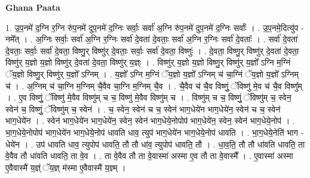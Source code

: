 \documentclass[17pt]{extarticle}
\begin{document}
\textbf{Ghana Paata } \newline

1. उ॒प॒नमे॑ द॒ग्नि र॒ग्नि रु॑प॒नमे॑ दुप॒नमे॑ द॒ग्निः सर्वाः॒ सर्वा॑ अ॒ग्नि रु॑प॒नमे॑ दुप॒नमे॑ द॒ग्निः सर्वाः᳚ । . उ॒प॒नमे॒दित्यु॑प - नमे᳚त् । . अ॒ग्निः सर्वाः॒ सर्वा॑ अ॒ग्नि र॒ग्निः सर्वा॑ दे॒वता॑ दे॒वताः॒ सर्वा॑ अ॒ग्नि र॒ग्निः सर्वा॑ दे॒वताः᳚ । . सर्वा॑ दे॒वता॑ दे॒वताः॒ सर्वाः॒ सर्वा॑ दे॒वता॒ विष्णु॒र् विष्णु॑र् दे॒वताः॒ सर्वाः॒ सर्वा॑ दे॒वता॒ विष्णुः॑ । . दे॒वता॒ विष्णु॒र् विष्णु॑र् दे॒वता॑ दे॒वता॒ विष्णु॑र् य॒ज्ञो य॒ज्ञो विष्णु॑र् दे॒वता॑ दे॒वता॒ विष्णु॑र् य॒ज्ञ्ः । . विष्णु॑र् य॒ज्ञो य॒ज्ञो विष्णु॒र् विष्णु॑र् य॒ज्ञो᳚ ऽग्नि म॒ग्निं ॅय॒ज्ञो विष्णु॒र् विष्णु॑र् य॒ज्ञो᳚ ऽग्निम् । . य॒ज्ञो᳚ ऽग्नि म॒ग्निं ॅय॒ज्ञो य॒ज्ञो᳚ ऽग्निम् च॑ चा॒ग्निं ॅय॒ज्ञो य॒ज्ञो᳚ ऽग्निम् च॑ । . अ॒ग्निम् च॑ चा॒ग्नि म॒ग्निम् चै॒वैव चा॒ग्नि म॒ग्निम् चै॒व । . चै॒वैव च॑ चै॒व विष्णुं॒ ॅविष्णु॑ मे॒व च॑ चै॒व विष्णु᳚म् । . ए॒व विष्णुं॒ ॅविष्णु॑ मे॒वैव विष्णु॑म् च च॒ विष्णु॑ मे॒वैव विष्णु॑म् च । . विष्णु॑म् च च॒ विष्णुं॒ ॅविष्णु॑म् च॒ स्वेन॒ स्वेन॑ च॒ विष्णुं॒ ॅविष्णु॑म् च॒ स्वेन॑ । . च॒ स्वेन॒ स्वेन॑ च च॒ स्वेन॑ भाग॒धेये॑न भाग॒धेये॑न॒ स्वेन॑ च च॒ स्वेन॑ भाग॒धेये॑न । . स्वेन॑ भाग॒धेये॑न भाग॒धेये॑न॒ स्वेन॒ स्वेन॑ भाग॒धेये॒नोपोप॑ भाग॒धेये॑न॒ स्वेन॒ स्वेन॑ भाग॒धेये॒नोप॑ । . भा॒ग॒धेये॒नोपोप॑ भाग॒धेये॑न भाग॒धेये॒नोप॑ धावति धाव॒ त्युप॑ भाग॒धेये॑न भाग॒धेये॒नोप॑ धावति । . भा॒ग॒धेये॒नेति॑ भाग - धेये॑न । . उप॑ धावति धाव॒ त्युपोप॑ धावति॒ तौ तौ धा॑व॒ त्युपोप॑ धावति॒ तौ । . धा॒व॒ति॒ तौ तौ धा॑वति धावति॒ ता वे॒वैव तौ धा॑वति धावति॒ ता वे॒व । . ता वे॒वैव तौ ता वे॒वास्मा॑ अस्मा ए॒व तौ ता वे॒वास्मै᳚ । . ए॒वास्मा॑ अस्मा ए॒वैवास्मै॑ य॒ज्ञ्ं ॅय॒ज्ञ् म॑स्मा ए॒वैवास्मै॑ य॒ज्ञ्म् । \newline
\end{document}
